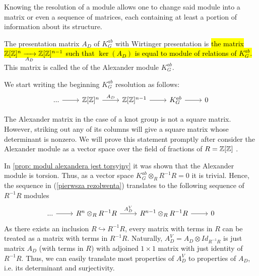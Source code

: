 Knowing the resolution of a module allows one to change said module into a matrix or even a sequence of matrices, each containing at least a portion of information about its structure.

\begin{definition}
  The presentation matrix $A_D$ of $K_G^{ab}$ with Wirtinger presentation is \hl{the matrix $\operatorname{\mathbb{Z}}[\operatorname{\mathbb{Z}}]^n\xrightarrow[A_D]{}\operatorname{\mathbb{Z}}[\operatorname{\mathbb{Z}}]^{n-1}$ such that $\ker(A_D)$ is equal to module of relations of $K_G^{ab}$.} This matrix is called the  of the Alexander module $K_G^{ab}$.
\end{definition}

We start writing the beginning $K_G^{ab}$ resolution as follows:
\begin{equation}\label{pierwsza rezolwenta}
  \begin{tikzcd}
    ...\arrow[r] & \Z[\Z]^{n}\arrow[r, "A_D"] & \Z[\Z]^{n-1}\arrow[r] & K_G^{ab}\arrow[r] & 0
  \end{tikzcd}
\end{equation}



The Alexander matrix in the case of a knot group is not a square matrix. However, striking out any of its columns will give a square matrix whose determinant is nonzero. We will prove this statement promptly after consider the Alexander module as a vector space over the field of fractions of $R=\operatorname{\mathbb{Z}}[\operatorname{\mathbb{Z}}]$ \cite[Chapter~3]{atiyah}.

In \cref{prop: modul alexandera jest torsyjny} it was shown that the Alexander module is torsion. Thus, as a vector space $K_G^{ab}\otimes_R R^{-1}R=0$ it is trivial. Hence, the sequence in (\ref{pierwsza rezolwenta}) translates to the following sequence of $R^{-1}R$ modules
\begin{equation}\label{resolution vector spaces}
  \begin{tikzcd}
    ...\arrow[r] & R^n\otimes_R R^{-1}R \arrow[r, "A_D^V"] & R^{n-1}\otimes_R R^{-1}R \arrow[r] & 0
  \end{tikzcd}
\end{equation}
As there exists an inclusion $R\hookrightarrow R^{-1}R$, every matrix with terms in $R$ can be treated as a matrix with terms in $R^{-1}R$. Naturally, $A_D^V=A_D\otimes Id_{R^{-1}R}$ is just matrix $A_D$ (with terms in $R$) with adjoined $1\times 1$ matrix with just identity of $R^{-1}R$. Thus, we can easily translate most properties of $A_D^V$ to properties of $A_D$, i.e. its determinant and surjectivity.%

